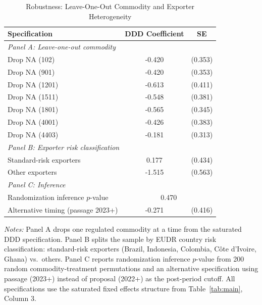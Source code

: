 \begin{table}[htbp]
\centering
\caption{Robustness: Leave-One-Out Commodity and Exporter Heterogeneity}
\label{tab:robust}
\small
\begin{tabular}{lcc}
\hline\hline
Specification & DDD Coefficient & SE \\
\hline
\multicolumn{3}{l}{\textit{Panel A: Leave-one-out commodity}} \\
\quad Drop NA (102) & -0.420 & (0.353) \\
\quad Drop NA (901) & -0.420 & (0.353) \\
\quad Drop NA (1201) & -0.613 & (0.411) \\
\quad Drop NA (1511) & -0.548 & (0.381) \\
\quad Drop NA (1801) & -0.565 & (0.345) \\
\quad Drop NA (4001) & -0.426 & (0.383) \\
\quad Drop NA (4403) & -0.181 & (0.313) \\
\hline
\multicolumn{3}{l}{\textit{Panel B: Exporter risk classification}} \\
\quad Standard-risk exporters & 0.177 & (0.434) \\
\quad Other exporters & -1.515 & (0.563) \\
\hline
\multicolumn{3}{l}{\textit{Panel C: Inference}} \\
\quad Randomization inference $p$-value & \multicolumn{2}{c}{0.470} \\
\quad Alternative timing (passage 2023+) & -0.271 & (0.416) \\
\hline\hline
\end{tabular}
\begin{minipage}{0.95\textwidth}
\vspace{0.3em}\footnotesize
\textit{Notes:} Panel A drops one regulated commodity at a time from the saturated DDD specification. Panel B splits the sample by EUDR country risk classification: standard-risk exporters (Brazil, Indonesia, Colombia, C\^ote d'Ivoire, Ghana) vs.\ others. Panel C reports randomization inference $p$-value from 200 random commodity-treatment permutations and an alternative specification using passage (2023+) instead of proposal (2022+) as the post-period cutoff. All specifications use the saturated fixed effects structure from Table~\ref{tab:main}, Column 3.
\end{minipage}
\end{table}
